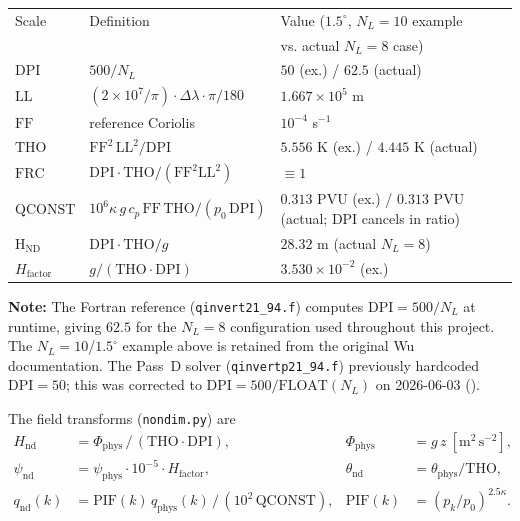 \begin{center}\small
\begin{tabular}{lll}
  \toprule
  Scale & Definition & Value ($1.5^\circ$, $N_L{=}10$ example \\
  & & \quad vs. actual $N_L{=}8$ case) \\
  \midrule
  $\mathrm{DPI}$        & $500/N_L$                                  & $50$ (ex.) / $62.5$ (actual) \\
  $\mathrm{LL}$         & $(2\!\times\!10^{7}/\pi)\cdot\Delta\lambda\cdot\pi/180$ & $1.667\times10^{5}$ m \\
  $\mathrm{FF}$         & reference Coriolis                          & $10^{-4}$ s$^{-1}$ \\
  $\mathrm{THO}$        & $\mathrm{FF}^2\,\mathrm{LL}^2/\mathrm{DPI}$ & $5.556$ K (ex.) / $4.445$ K (actual) \\
  $\mathrm{FRC}$        & $\mathrm{DPI}\cdot\mathrm{THO}/(\mathrm{FF}^2\mathrm{LL}^2)$ & $\equiv 1$ \\
  $\mathrm{QCONST}$     & $10^{6}\kappa\,g\,c_p\,\mathrm{FF}\,\mathrm{THO}/(p_0\,\mathrm{DPI})$ & $0.313$ PVU (ex.) / $0.313$ PVU (actual; DPI cancels in ratio) \\
  $\mathrm{H_{ND}}$     & $\mathrm{DPI}\cdot\mathrm{THO}/g$            & $28.32$ m (actual $N_L{=}8$) \\
  $H_{\text{factor}}$   & $g/(\mathrm{THO}\cdot\mathrm{DPI})$         & $3.530\times10^{-2}$ (ex.) \\
  \bottomrule
\end{tabular}
\end{center}

\noindent \textbf{Note:} The Fortran reference (\texttt{qinvert21\_94.f})
computes $\mathrm{DPI}=500/N_L$ at runtime, giving $62.5$ for the
$N_L{=}8$ configuration used throughout this project.  The
$N_L{=}10$/$1.5^\circ$ example above is retained from the original
Wu documentation.  The Pass~D solver (\texttt{qinvertp21\_94.f})
previously hardcoded $\mathrm{DPI}=50$; this was corrected to
$\mathrm{DPI}=500/\mathrm{FLOAT}(N_L)$ on 2026-06-03
().

\noindent The field transforms (\texttt{nondim.py}) are
\begin{align}
H_{\text{nd}} &= \Phi_{\text{phys}}\,/\,(\mathrm{THO}\cdot\mathrm{DPI}),
   &\Phi_{\text{phys}}&=g\,z\ [\text{m}^2\,\text{s}^{-2}], \\
\psi_{\text{nd}} &= \psi_{\text{phys}}\cdot 10^{-5}\cdot H_{\text{factor}},
   &\theta_{\text{nd}}&=\theta_{\text{phys}}/\mathrm{THO}, \\
q_{\text{nd}}(k) &= \mathrm{PIF}(k)\,q_{\text{phys}}(k)\,/\,(10^{2}\,\mathrm{QCONST}),
   &\mathrm{PIF}(k)&=(p_k/p_0)^{2.5\kappa}.
\end{align}

